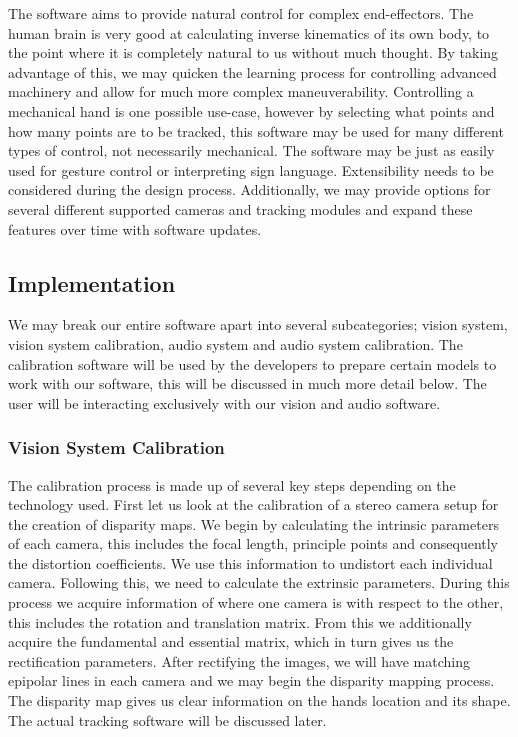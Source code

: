 \documentclass{article}
\begin{document}
The software aims to provide natural control for complex end-effectors. The human brain is very good at calculating inverse kinematics of its own body, to the point where it is completely natural to us without much thought. By taking advantage of this, we may quicken the learning process for controlling advanced machinery and allow for much more complex maneuverability. Controlling a mechanical hand is one possible use-case, however by selecting what points and how many points are to be tracked, this software may be used for many different types of control, not necessarily mechanical. The software may be just as easily used for gesture control or interpreting sign language. Extensibility needs to be considered during the design process. Additionally, we may provide options for several different supported cameras and tracking modules and expand these features over time with software updates.

\subsection{Implementation}
We may break our entire software apart into several subcategories; vision system, vision system calibration, audio system and audio system calibration. The calibration software will be used by the developers to prepare certain models to work with our software, this will be discussed in much more detail below. The user will be interacting exclusively with our vision and audio software.
\subsubsection{Vision System Calibration}
The calibration process is made up of several key steps depending on the technology used. First let us look at the calibration of a stereo camera setup for the creation of disparity maps. We begin by calculating the intrinsic parameters of each camera, this includes the focal length, principle points and consequently the distortion coefficients. We use this information to undistort each individual camera. Following this, we need to calculate the extrinsic parameters. During this process we acquire information of where one camera is with respect to the other, this includes the rotation and translation matrix. From this we additionally acquire the fundamental and essential matrix, which in turn gives us the rectification parameters. After rectifying the images, we will have matching epipolar lines in each camera and we may begin the disparity mapping process. The disparity map gives us clear information on the hands location and its shape. The actual tracking software will be discussed later.
\end{document}
